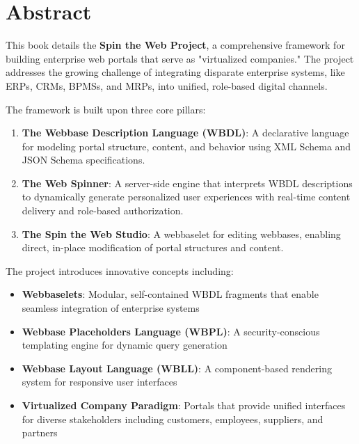 
\chapter*{Abstract}

This book details the \textbf{Spin the Web Project}, a comprehensive framework for building enterprise web portals that serve as "virtualized companies." The project addresses the growing challenge of integrating disparate enterprise systems, like ERPs, CRMs, BPMSs, and MRPs, into unified, role-based digital channels.

The framework is built upon three core pillars:

\begin{enumerate}
\item \textbf{The Webbase Description Language (WBDL)}: A declarative language for modeling portal structure, content, and behavior using XML Schema and JSON Schema specifications.

\item \textbf{The Web Spinner}: A server-side engine that interprets WBDL descriptions to dynamically generate personalized user experiences with real-time content delivery and role-based authorization.

\item \textbf{The Spin the Web Studio}: A webbaselet for editing webbases, enabling direct, in-place modification of portal structures and content.
\end{enumerate}

The project introduces innovative concepts including:
\begin{itemize}
\item \textbf{Webbaselets}: Modular, self-contained WBDL fragments that enable seamless integration of enterprise systems
\item \textbf{Webbase Placeholders Language (WBPL)}: A security-conscious templating engine for dynamic query generation
\item \textbf{Webbase Layout Language (WBLL)}: A component-based rendering system for responsive user interfaces
\item \textbf{Virtualized Company Paradigm}: Portals that provide unified interfaces for diverse stakeholders including customers, employees, suppliers, and partners
\end{itemize}

